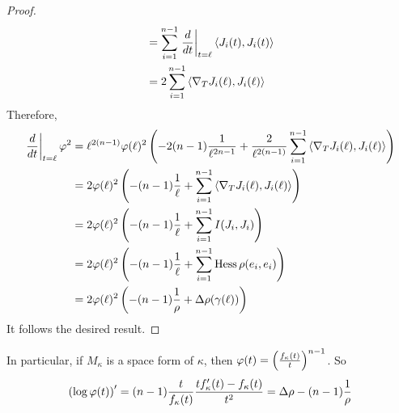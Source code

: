 \begin{enumerate}[label=\arabic{*}]
\begin{proof}
\begin{equation*}
\begin{aligned}
				&= \sum_{i=1}^{n-1} \left.\frac{d}{dt}\right\lvert_{t=\ell} \left\langle J_i(t),J_i(t) \right\rangle\\
				&= 2\sum_{i=1}^{n-1}\left\langle \nabla_TJ_i(\ell),J_i(\ell) \right\rangle
			\end{aligned}
		\end{equation*}
		Therefore,
		\begin{equation*}
			\begin{aligned}
				\left.\frac{d}{dt}\right\lvert_{t = \ell}\varphi^2 &= \ell^{2(n-1)}\varphi(\ell)^2\left(-2(n-1)\frac{1}{\ell^{2n-1}} + \frac{2}{\ell^{2(n-1)}} \sum_{i=1}^{n-1}\left\langle \nabla_TJ_i(\ell),J_i(\ell) \right\rangle \right) \\
				&= 2\varphi(\ell)^2\left(-(n-1)\frac{1}{\ell} + \sum_{i=1}^{n-1}\left\langle \nabla_TJ_i(\ell),J_i(\ell) \right\rangle \right) \\
				&= 2\varphi(\ell)^2\left(-(n-1)\frac{1}{\ell} + \sum_{i=1}^{n-1}I(J_i,J_i)\right) \\
				&= 2\varphi(\ell)^2\left(-(n-1)\frac{1}{\ell} + \sum_{i=1}^{n-1}\operatorname{Hess}\rho(e_i,e_i)\right)\\
				&= 2\varphi(\ell)^2\left(-(n-1)\frac{1}{\rho} + \Delta \rho (\gamma(\ell))\right)
			\end{aligned}
		\end{equation*}
		It follows the desired result.
	\end{proof}
	\begin{rmk}
		In particular, if $M_\kappa$ is a space form of $\kappa$, then $\varphi(t) = \left(\frac{f_{\kappa}(t)}{t}\right)^{n-1}$. So
		\begin{equation*}
			\left(\log \varphi(t) \right)^\prime = (n-1) \frac{t}{f_{\kappa}(t)}\frac{tf^\prime_{\kappa}(t) - f_\kappa(t)}{t^2} = \Delta \rho - (n-1)\frac{1}{\rho}
		\end{equation*}
	\end{rmk}
	

\end{enumerate}
